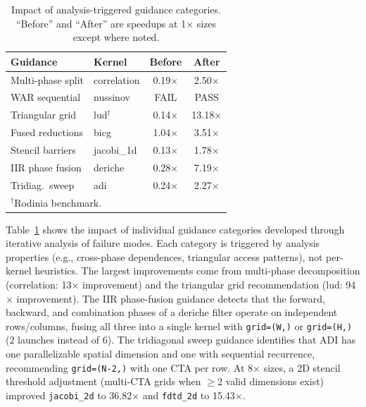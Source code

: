 \documentclass[sigconf]{acmart}
\begin{document}
\begin{table}[t]
  \caption{Impact of analysis-triggered guidance categories.
    ``Before'' and ``After'' are speedups at 1$\times$ sizes
    except where noted.}
  \label{tab:guidance_fixes}
  \centering\small
  \begin{tabular}{llcc}
    \toprule
    \textbf{Guidance} & \textbf{Kernel} & \textbf{Before} & \textbf{After} \\
    \midrule
    Multi-phase split      & correlation & 0.19$\times$ & 2.50$\times$ \\
    WAR sequential         & nussinov    & FAIL          & PASS         \\
    Triangular grid        & lud$^\dagger$ & 0.14$\times$ & 13.18$\times$ \\
    Fused reductions       & bicg        & 1.04$\times$ & 3.51$\times$ \\
    Stencil barriers       & jacobi\_1d  & 0.13$\times$ & 1.78$\times$ \\
    IIR phase fusion       & deriche     & 0.28$\times$ & 7.19$\times$ \\
    Tridiag.\ sweep        & adi         & 0.24$\times$ & 2.27$\times$ \\
    \bottomrule
    \multicolumn{4}{l}{\scriptsize $^\dagger$Rodinia benchmark.}
  \end{tabular}
\end{table}

Table~\ref{tab:guidance_fixes} shows the impact of individual guidance
categories developed through iterative analysis of failure modes.
Each category is triggered by analysis properties (e.g., cross-phase
dependences, triangular access patterns), not per-kernel heuristics.
The largest improvements come from multi-phase decomposition
(correlation: 13$\times$ improvement) and the triangular grid
recommendation (lud: 94$\times$ improvement).  The IIR phase-fusion
guidance detects that the forward, backward, and combination phases
of a deriche filter operate on independent rows/columns, fusing all
three into a single kernel with \texttt{grid=(W,)} or
\texttt{grid=(H,)} (2 launches instead of 6).  The tridiagonal sweep
guidance identifies that ADI has one parallelizable spatial dimension
and one with sequential recurrence, recommending \texttt{grid=(N-2,)}
with one CTA per row.  At 8$\times$ sizes, a 2D stencil threshold
adjustment (multi-CTA grids when $\geq$2 valid dimensions exist)
improved \texttt{jacobi\_2d} to 36.82$\times$ and \texttt{fdtd\_2d}
to 15.43$\times$.
\end{document}
